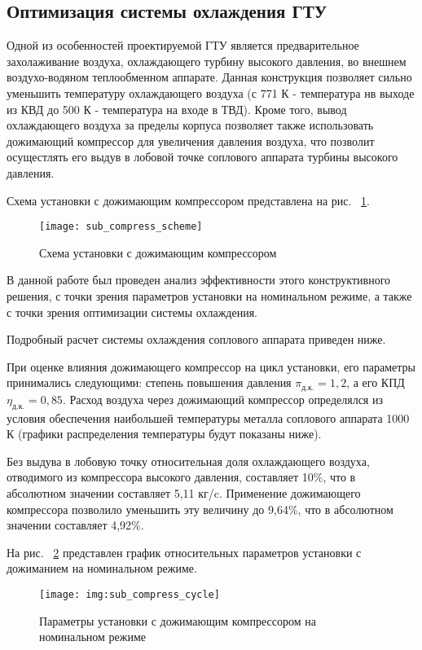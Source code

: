 \subsection{Оптимизация системы охлаждения ГТУ}
Одной из особенностей проектируемой ГТУ является предварительное захолаживание воздуха, охлаждающего турбину высокого давления, во внешнем воздухо-водяном теплообменном аппарате. Данная конструкция позволяет сильно уменьшить температуру охлаждающего воздуха (с 771 К - температура нв выходе из КВД до 500 К - температура на входе в ТВД). Кроме того, вывод охлаждающего воздуха за пределы корпуса позволяет также использовать дожимающий компрессор для увеличения давления воздуха, что позволит осущестлять его выдув в лобовой точке соплового аппарата турбины высокого давления.

Схема установки с дожимающим компрессором представлена на рис. ~\ref{img:sub_compress_scheme}.

\begin{figure}[H]
    \centering
    \texttt{[image: sub\_compress\_scheme]}
    \caption{Схема установки с дожимающим компрессором}
	\label{img:sub_compress_scheme}
\end{figure}

В данной работе был проведен анализ эффективности этого конструктивного решения, с точки зрения параметров установки на номинальном режиме, а также с точки зрения оптимизации системы охлаждения. 

Подробный расчет системы охлаждения соплового аппарата приведен ниже.

При оценке влияния дожимающего компрессор на цикл установки, его параметры принимались следующими: степень повышения давления $\pi_{д.к.} = 1,2$, а его КПД $\eta_{д.к.} = 0,85$.
Расход воздуха через дожимающий компрессор определялся из условия обеспечения наибольшей температуры металла соплового аппарата 1000 К (графики распределения температуры будут показаны ниже).

Без выдува в лобовую точку относительная доля охлаждающего воздуха, отводимого из компрессора высокого давления, составляет 10\%, что в абсолютном значении составляет 5,11 кг/c. Применение дожимающего компрессора позволило уменьшить эту величину до 9,64\%, что в абсолютном значении составляет 4,92\%. 

На рис. ~\ref{img:sub_compress_cycle} представлен график относительных параметров установки с дожиманием на номинальном режиме.  

\begin{figure}[H]
    \centering
    \texttt{[image: img:sub\_compress\_cycle]}
    \caption{Параметры установки с дожимающим компрессором на номинальном режиме}
	\label{img:sub_compress_cycle}
\end{figure}

